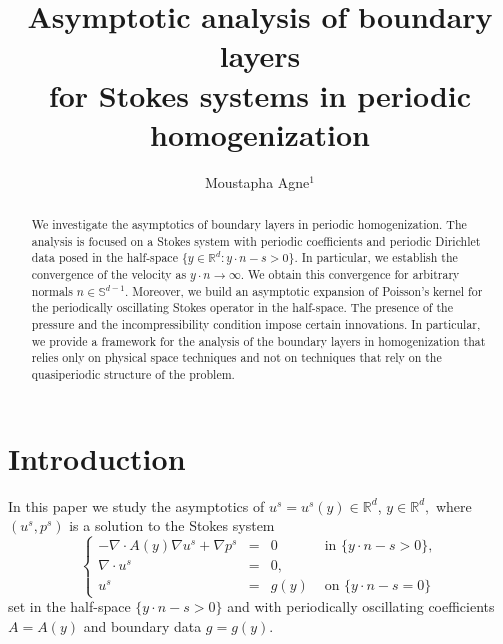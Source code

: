 \documentclass[11pt, reqno]{amsart}
\theoremstyle{definition}
\theoremstyle{remark}
\numberwithin{equation}{section}
\begin{document}
	\setcounter{page}{1}
	
	
	
	
	\title[]{Asymptotic analysis of boundary layers\\ for Stokes systems in periodic homogenization}
	
	\author[]{Moustapha Agne$^1$ }
	
	\address{$^1$ AGM--Department of Mathematics, 2 av. Adolphe Chauvin,
		95302 CERGY-PONTOISE, CY Cergy Paris University, Cergy-Pontoise, France.}
	\email{\textcolor[rgb]{0.00,0.00,0.84}{moustapha.agne@cyu.fr}}
	
	
	
	
	
	
	\begin{abstract}
		We investigate the asymptotics of boundary layers in periodic homogenization. The analysis is focused on a  Stokes system with periodic coefficients and periodic Dirichlet data posed in the half-space $\{y\in \mathbb{R}^d: y\cdot n -s>0\}$. In particular, we establish the convergence of the velocity as $y\cdot n \rightarrow \infty$. We obtain this convergence for arbitrary normals $n\in \mathbb{S}^{d-1}$\!. Moreover, we build an asymptotic expansion of Poisson's kernel for the periodically oscillating Stokes operator in the half-space. 	The presence of the pressure and the incompressibility condition impose certain innovations. In particular, we provide a framework for the analysis of the boundary layers in homogenization that relies only on physical space techniques and not on techniques that rely on the quasiperiodic structure of the problem.
	\end{abstract}
	
	
	\maketitle
	
	\section{Introduction}
	
	\noindent In this paper we study the asymptotics of $u^s=u^s(y)\in\mathbb{R}^d$, $y\in\mathbb{R}^d,$ where $(u^s,p^s)$ is a solution to the Stokes system
	\begin{equation}\label{hsStokes}
		\left\{
		\begin{array}{rcll}
			-\nabla\cdot A (y) \nabla u^s +  \nabla p^s&=& 0 &   \mbox{ in } \{ y\cdot n-s>0 \},\\
			\nabla\cdot u^s&=& 0, \; \\
			u^s&=& g (y)  & \mbox{ on }  \{y\cdot n-s=0\}
		\end{array}
		\right. 
	\end{equation}
	set in the half-space $\{ y\cdot n-s>0 \}$  and with periodically oscillating coefficients $A=A(y)$ and boundary data $g=g(y)$.\\
	
\end{document}
